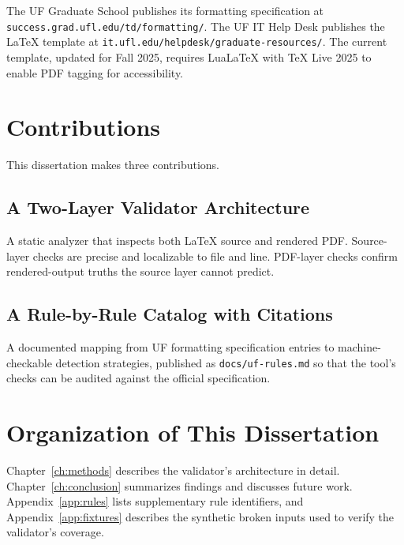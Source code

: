 The UF Graduate School publishes its formatting specification at
\texttt{success.grad.ufl.edu/td/formatting/}. The UF IT Help Desk
publishes the LaTeX template at
\texttt{it.ufl.edu/helpdesk/graduate-resources/}. The current template,
updated for Fall 2025, requires LuaLaTeX with TeX Live 2025 to enable
PDF tagging for accessibility.

\section{Contributions}

This dissertation makes three contributions.

\subsection{A Two-Layer Validator Architecture}

A static analyzer that inspects both LaTeX source and rendered PDF.
Source-layer checks are precise and localizable to file and line.
PDF-layer checks confirm rendered-output truths the source layer
cannot predict.

\subsection{A Rule-by-Rule Catalog with Citations}

A documented mapping from UF formatting specification entries to
machine-checkable detection strategies, published as
\texttt{docs/uf-rules.md} so that the tool's checks can be audited
against the official specification.

\section{Organization of This Dissertation}

Chapter~\ref{ch:methods} describes the validator's architecture in
detail. Chapter~\ref{ch:conclusion} summarizes findings and discusses
future work. Appendix~\ref{app:rules} lists supplementary rule
identifiers, and Appendix~\ref{app:fixtures} describes the synthetic
broken inputs used to verify the validator's coverage.
